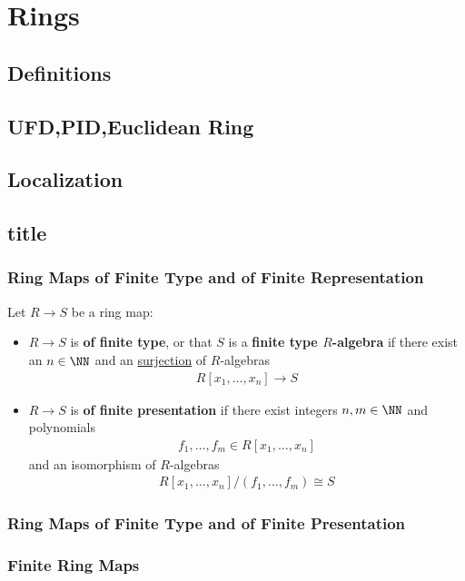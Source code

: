 \documentclass[Total.tex]{subfiles}
\begin{document}
	\chapter{Rings}
		\section{Definitions}
		\section{UFD,PID,Euclidean Ring}
		\section{Localization}
		\section{title}
			\subsection{Ring Maps of Finite Type and of Finite Representation}
			\begin{Def}
				Let $R\rightarrow S$ be a ring map:
				\begin{itemize}
					\item $R\rightarrow S$ is \textbf{of finite type}, or that $S$ is a \textbf{finite type $R$-algebra} if there exist an $n\in \NN$ and an \underline{surjection} of $R$-algebras
					\begin{gather*}
						R[x_1,\dots,x_n]\rightarrow S
					\end{gather*}
					\item $R\rightarrow S$ is \textbf{of finite presentation} if there exist integers $n,m\in \NN$ and polynomials
					\begin{gather*}
						f_1,\dots,f_m\in R[x_1,\dots,x_n]
					\end{gather*}
					and an isomorphism of $R$-algebras
					\begin{gather*}
						R[x_1,\dots,x_n]/(f_1,\dots,f_m)\cong S
					\end{gather*}
				\end{itemize}
			\end{Def}
			\subsection{Ring Maps of Finite Type and of Finite Presentation}
			\subsection{Finite Ring Maps}
\end{document}
